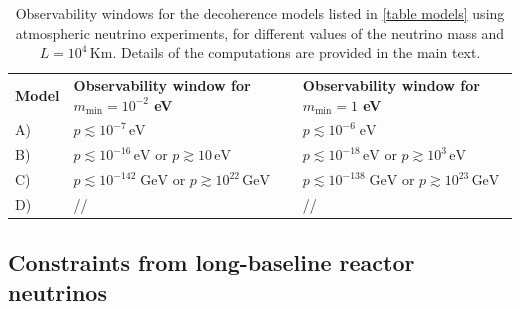 \documentclass[11pt]{article}
\begin{document}
\begin{table}
    \centering
{\tabulinesep=1.2mm
        \begin{tabu}{|l|l|l|}
       {\small\bf{Model}} & {\footnotesize \bf{Observability window for $m_{\text{min}}=10^{-2}$ eV}} &{\footnotesize \bf{Observability window for $m_{\text{min}}=1$ eV}} \\ 
       {\small  A)} & $p\lesssim 10^{-7}\,\text{eV}$ & $p\lesssim 10^{-6}\; \text{eV}$\\ 
           {\small  B)} &  $p\lesssim 10^{-16}\,\text{eV}$ or $p\gtrsim 10\,\text{eV}$  & $p\lesssim 10^{-18}\,\text{eV}$ or $p\gtrsim 10^{3}\,\text{eV}$\\ 
        {\small  C)} & $p\lesssim 10^{-142}\;\text{GeV}$ or $p\gtrsim 10^{22}\,\text{GeV}$ & $p\lesssim 10^{-138}\;\text{GeV}$ or $p\gtrsim 10^{23}\,\text{GeV}$\\ 
        {\small  D)} &  // & // \\  
        \end{tabu}}
    \caption{Observability windows for the decoherence models listed in \cref{table models} using atmospheric neutrino experiments, for different values of the neutrino mass and $L=10^4\,\text{Km}$. Details of the computations are provided in the main text.}
    \label{windows_atmo_table_2}
\end{table}



\subsection{Constraints from long-baseline reactor neutrinos}\label{analysis KAM}
\end{document}
